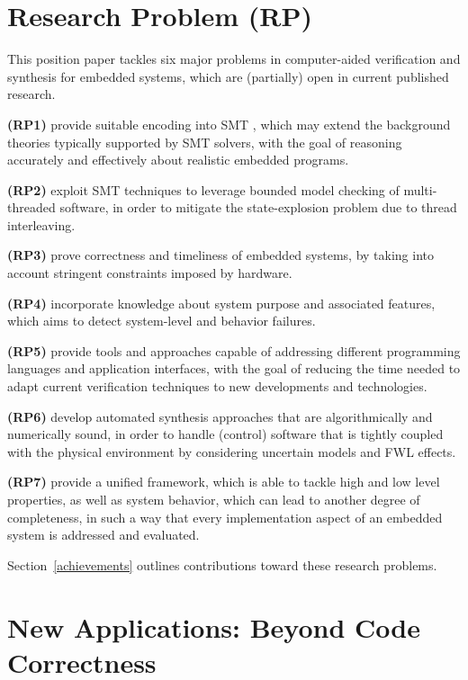 \documentclass{acm_sen_article}
\begin{document}
\section{Research Problem (RP)}
\label{Research-Problem}

This position paper tackles six major problems in computer-aided verification and synthesis for embedded systems, which are (partially) open in current published research.

\textbf{(RP1)} provide suitable encoding into SMT \cite{BarrettSST09}, which may extend the background theories typically supported by SMT solvers, with the goal of reasoning accurately and effectively about realistic embedded programs.

\textbf{(RP2)} exploit SMT techniques to leverage bounded model checking of multi-threaded software, in order to mitigate the state-explosion problem due to thread interleaving.
	
\textbf{(RP3)} prove correctness and timeliness of embedded systems, by taking into account stringent constraints imposed by hardware.
	
\textbf{(RP4)} incorporate knowledge about system purpose and associated features, which aims to detect system-level and behavior failures.

\textbf{(RP5)} provide tools and approaches capable of addressing different programming languages and application interfaces, with the goal of reducing the time needed to adapt current verification techniques to new developments and technologies.

\textbf{(RP6)} develop automated synthesis approaches that are algorithmically and numerically sound, in order to handle (control) software that is tightly coupled with the physical environment by considering uncertain models and FWL effects.

\textbf{(RP7)} provide a unified framework, which is able to tackle high and low level properties, as well as system behavior, which can lead to another degree of completeness, in such a way that every implementation aspect of an embedded system is addressed and evaluated.


Section~\ref{achievements} outlines contributions toward these research problems.

\section{New Applications: Beyond Code Correctness}
\label{Newapp}
\end{document}
